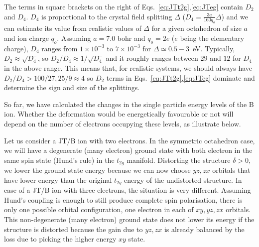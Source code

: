 \documentclass[a4paper,prb,twocolumn]{revtex4-1}  %
\begin{document}
The terms in square brackets on the right of Eqs.~\ref{eq:JTt2g},\ref{eq:JTeg}
contain $D_2$ and $D_4$. 
$D_4$ is proportional to the crystal field splitting $\Delta$ 
($D_4=\frac{3a}{160q_o} \Delta$) and 
we can estimate its value from realistic values of $\Delta$ for a given octahedron of size $a$ and ion charge $q_o$. 
Assuming $a=7.0$ bohr and $q_o=2e$ ($e$ being the elementary charge),
$D_4$ ranges from $1 \times 10^{-3}$ to  $7 \times 10^{-3}$
for $\Delta \simeq 0.5-3$~eV.
Typically, ${D_{2}\approx \sqrt{D_{4}}}$,
so $D_{2}/D_{4} \approx 1/\sqrt{D_{4}}$
and it roughly ranges between $29$ and $12$ for $D_4$ in the above range.
This means that, for realistic systems, 
we should always have $D_{2}/D_{4} > 100/27, 25/9 \approx 4$
so 
$D_{2}$ terms in 
Eqs.~\ref{eq:JTt2g},\ref{eq:JTeg}
dominate and determine the sign and size of the splittings.


So far, we have calculated the changes in the single particle energy levels of the B ion. 
Whether the deformation would be energetically favourable 
or not will depend on the number of electrons occupying these levels,
as illustrate below.


Let us consider %
a JT/B ion with two electrons.
In the symmetric octahedron case, 
we will have a degenerate (many electron) ground state 
with both electron in the same spin state (Hund's rule) in the $t_{2g}$ manifold.
Distorting the structure $\delta>0$, we lower the ground state energy because 
we can now choose $yz,zx$ orbitals that have lower energy than the original $t_{2g}$ energy of the undistorted structure.
In case of a JT/B ion with three electrons, the situation is very different.
Assuming Hund's coupling is enough to still produce complete spin polarisation,
there is only one possible orbital configuration, one electron in each of $xy,yz,zx$ orbitals.
This non-degenerate (many electron) ground state
does not lower its energy if the structure is distorted 
because the gain due to $yz,zx$ is already balanced by the loss due to picking the higher energy $xy$ state.
\end{document}
